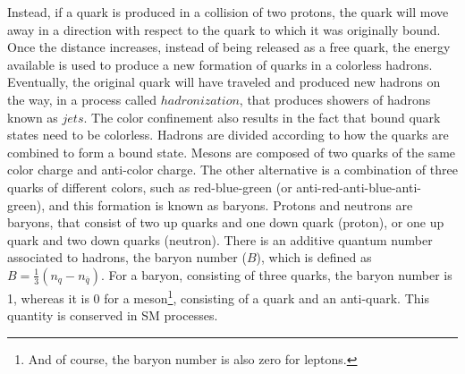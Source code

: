 Instead, if a quark is produced in a collision of two protons, the quark will move away in a direction with respect to the quark to which it was originally bound. 
Once the distance increases, instead of being released as a free quark, the energy available is used to produce a new formation of quarks in a colorless hadrons. 
Eventually, the original quark will have traveled and produced new hadrons on the way, in a process called $hadronization$, that produces showers of hadrons known as $jets$. 
\newpara
\noindent\justify
The color confinement also results in the fact that bound quark states need to be colorless.
Hadrons are divided according to how the quarks are combined to form a bound state.  
Mesons are composed of two quarks of the same color charge and anti-color charge. 
The other alternative is a combination of three quarks of different colors, such as red-blue-green (or anti-red-anti-blue-anti-green), and this formation is known as baryons. 
Protons and neutrons are baryons, that consist of two up quarks and one down quark (proton), or one up quark and two down quarks (neutron). 
There is an additive quantum number associated to hadrons, the baryon number ($B$), which is defined as $B=\frac{1}{3}(n_{q}-n_{\bar{q}})$. 
For a baryon, consisting of three quarks, the baryon number is 1, whereas it is 0 for a meson\footnote{And of course, the baryon number is also zero for leptons.}, consisting of a quark and an anti-quark. This quantity is conserved in SM processes.  
